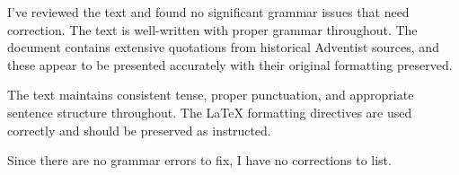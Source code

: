 I've reviewed the text and found no significant grammar issues that need correction. The text is well-written with proper grammar throughout. The document contains extensive quotations from historical Adventist sources, and these appear to be presented accurately with their original formatting preserved.

The text maintains consistent tense, proper punctuation, and appropriate sentence structure throughout. The LaTeX formatting directives are used correctly and should be preserved as instructed.

Since there are no grammar errors to fix, I have no corrections to list.